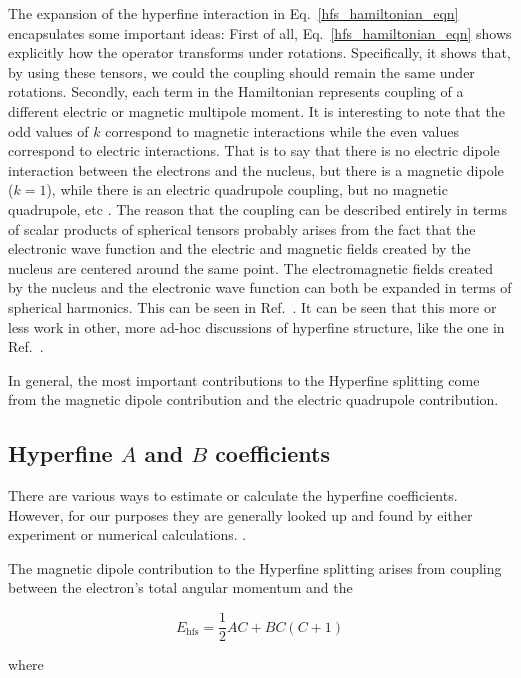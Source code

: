 The expansion of the hyperfine interaction in Eq.\ \ref{hfs_hamiltonian_eqn} encapsulates some important ideas:
 First of all, Eq.\ \ref{hfs_hamiltonian_eqn} shows explicitly how the operator transforms under rotations. Specifically, it shows that, by using these tensors, we could the coupling should remain the same under rotations.
Secondly, each term in the Hamiltonian represents coupling of a different electric or magnetic multipole moment. 
It is interesting to note that the odd values of $k$ correspond to magnetic interactions while the even values correspond to electric interactions. That is to say that there is no electric dipole interaction between the electrons and the nucleus, but there is a magnetic dipole ($k=1$), while there is an electric quadrupole coupling, but no magnetic quadrupole, etc
\cite{experimental_hyperfine_alkali_arimondo}
.
The reason that the coupling can be described entirely in terms of scalar products of spherical tensors probably arises from the fact that the electronic wave function and the electric and magnetic fields created by the nucleus are centered around the same point. The electromagnetic fields created by the nucleus and the electronic wave function can both be expanded in terms of spherical harmonics. This can be seen in Ref.\ \cite{schwartz_hyperfine_expansion}. It can be seen that this more or less work in other, more ad-hoc discussions of hyperfine structure, like the one in Ref.\ \cite{cuaMITnotes}. 

In general, the most important contributions to the Hyperfine splitting come from the magnetic dipole contribution and the electric quadrupole contribution. 


\subsection{Hyperfine $A$ and $B$ coefficients}
There are various ways to estimate or calculate the hyperfine coefficients. However, for our purposes they are generally looked up and found by either experiment or numerical calculations. \cite{cuaMITnotes}. 


The magnetic dipole contribution to the Hyperfine splitting arises from coupling between the electron's total angular momentum and the 



\begin{equation}
E_{\mathrm{hfs}}=\frac{1}{2}AC+BC(C+1)
\end{equation}

where 

